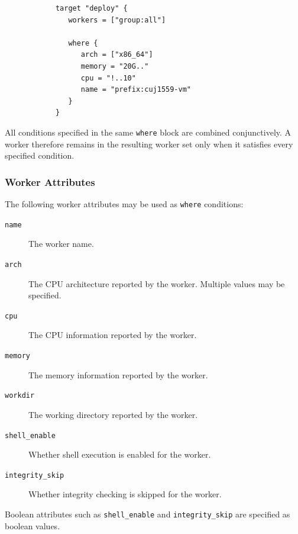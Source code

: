\documentclass[11pt,a4paper]{article}
\begin{document}
    \begin{center}
        \begin{verbatim}
            target "deploy" {
               workers = ["group:all"]

               where {
                  arch = ["x86_64"]
                  memory = "20G.."
                  cpu = "!..10"
                  name = "prefix:cuj1559-vm"
               }
            }
        \end{verbatim}
    \end{center}

    All conditions specified in the same \texttt{where} block are combined conjunctively.
    A worker therefore remains in the resulting worker set only when it satisfies every specified condition.

    \subsubsection{Worker Attributes}

    The following worker attributes may be used as \texttt{where} conditions:

    \begin{description}
        \item[\texttt{name}]
        The worker name.

        \item[\texttt{arch}]
        The CPU architecture reported by the worker.
        Multiple values may be specified.

        \item[\texttt{cpu}]
        The CPU information reported by the worker.

        \item[\texttt{memory}]
        The memory information reported by the worker.

        \item[\texttt{workdir}]
        The working directory reported by the worker.

        \item[\texttt{shell\_enable}]
        Whether shell execution is enabled for the worker.

        \item[\texttt{integrity\_skip}]
        Whether integrity checking is skipped for the worker.
    \end{description}

    Boolean attributes such as \texttt{shell\_enable} and \texttt{integrity\_skip} are specified as boolean values.
\end{document}
